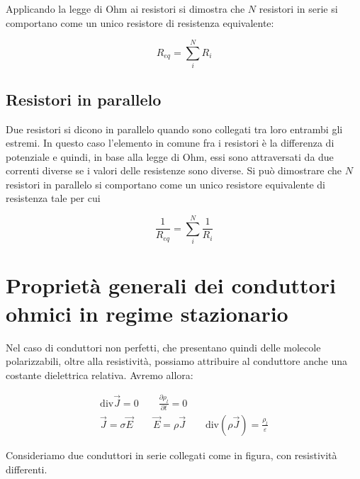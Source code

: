 Applicando la legge di Ohm ai resistori si dimostra che $N$ resistori in serie si comportano come un unico resistore di resistenza equivalente:

\[
	\boxed{R_{eq} = \sum_i^N R_i}
\]

\subsection{Resistori in parallelo}

Due resistori si dicono in parallelo quando sono collegati tra loro entrambi gli estremi. In questo caso l'elemento in comune fra i resistori è la differenza di potenziale e quindi, in base alla legge di Ohm, essi sono attraversati da due correnti diverse se i valori delle resistenze sono diverse. Si può dimostrare che $N$ resistori in parallelo si comportano come un unico resistore equivalente di resistenza tale per cui

\[
	\boxed{\frac{1}{R_{eq}} = \sum_i^N \frac{1}{R_i}}
\]

\section{Proprietà generali dei conduttori ohmici in regime stazionario}

Nel caso di conduttori non perfetti, che presentano quindi delle molecole polarizzabili, oltre alla resistività, possiamo attribuire al conduttore anche una costante dielettrica relativa. Avremo allora:

\begin{gather*}
	\text{div}\vec{J} = 0 \qquad \frac{\partial \rho_l}{\partial t} =0\\
	\vec{J} = \sigma \vec{E} \qquad \vec{E} = \rho \vec{J} \qquad \text{div}(\rho \vec{J} ) = \frac{\rho_l}{\varepsilon}
\end{gather*}

Consideriamo due conduttori in serie collegati come in figura, con resistività differenti.

